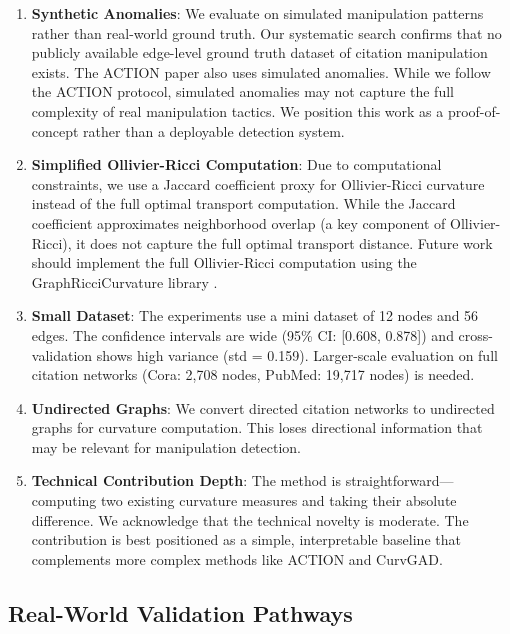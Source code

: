\documentclass[11pt,letterpaper]{article}
\begin{document}
\begin{enumerate}
  \item \textbf{Synthetic Anomalies}: We evaluate on simulated manipulation patterns rather than real-world ground truth. Our systematic search confirms that no publicly available edge-level ground truth dataset of citation manipulation exists. The ACTION paper \cite{Liu2024} also uses simulated anomalies. While we follow the ACTION protocol, simulated anomalies may not capture the full complexity of real manipulation tactics. We position this work as a proof-of-concept rather than a deployable detection system.

  \item \textbf{Simplified Ollivier-Ricci Computation}: Due to computational constraints, we use a Jaccard coefficient proxy for Ollivier-Ricci curvature instead of the full optimal transport computation. While the Jaccard coefficient approximates neighborhood overlap (a key component of Ollivier-Ricci), it does not capture the full optimal transport distance. Future work should implement the full Ollivier-Ricci computation using the GraphRicciCurvature library \cite{GraphRicciCurvature2024}.

  \item \textbf{Small Dataset}: The experiments use a mini dataset of 12 nodes and 56 edges. The confidence intervals are wide (95\% CI: [0.608, 0.878]) and cross-validation shows high variance (std = 0.159). Larger-scale evaluation on full citation networks (Cora: 2,708 nodes, PubMed: 19,717 nodes) is needed.

  \item \textbf{Undirected Graphs}: We convert directed citation networks to undirected graphs for curvature computation. This loses directional information that may be relevant for manipulation detection.

  \item \textbf{Technical Contribution Depth}: The method is straightforward---computing two existing curvature measures and taking their absolute difference. We acknowledge that the technical novelty is moderate. The contribution is best positioned as a simple, interpretable baseline that complements more complex methods like ACTION and CurvGAD.
\end{enumerate}

\subsection{Real-World Validation Pathways}
\end{document}
